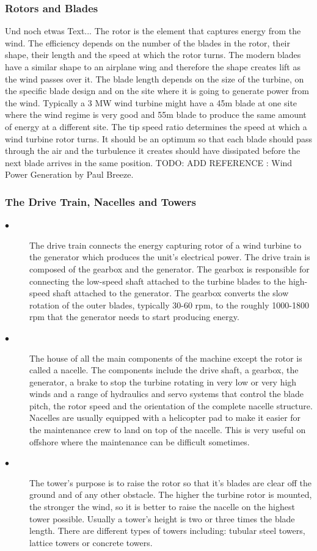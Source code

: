 \documentclass[twosided,a4,10pt]{article}
\begin{document}
\begin{multicols}{2}
 \subsubsection{Rotors and Blades}
 Und noch etwas Text... \cite{muster} \newline
 The rotor is the element that captures energy from the wind. The efficiency depends on the number of the blades in the rotor, their shape, their length and the speed at which the rotor turns. The modern blades have a similar shape to an airplane wing and therefore the shape creates lift as the wind passes over it. The blade length depends on the size of the turbine, on the specific blade design and on the site where it is going to generate power from the wind. Typically a 3 MW wind turbine might have a 45m blade at one site where the wind regime is very good and 55m blade to produce the same amount of energy at a different site. The tip speed ratio determines the speed at which a wind turbine rotor turns. It should be an optimum so that each blade should pass through the air and the turbulence it creates should have dissipated before the next blade arrives in the same position.
 TODO: ADD REFERENCE : Wind Power Generation by Paul Breeze.
\subsubsection{The Drive Train, Nacelles and Towers}
\begin{description}
\item[$\bullet$] 
The drive train connects the energy capturing rotor of a wind turbine to the generator which produces the unit's electrical power. The drive train is composed of the gearbox and the generator. The gearbox is responsible for connecting the low-speed shaft attached to the turbine blades to the high-speed shaft attached to the generator. The gearbox converts the slow rotation of the outer blades, typically 30-60 rpm, to the roughly 1000-1800 rpm that the generator needs to start producing energy.
\item[$\bullet$] 
The house of all the main components of the machine except the rotor is called a nacelle. The components include the drive shaft, a gearbox, the generator, a brake to stop the turbine rotating in very low or very high winds and a range of hydraulics and servo systems that control the blade pitch, the rotor speed and the orientation of the complete nacelle structure. Nacelles are usually equipped with a helicopter pad to make it easier for the maintenance crew to land on top of the nacelle. This is very useful on offshore where the maintenance can be difficult sometimes. 
\item[$\bullet$] 
The tower's purpose is to raise the rotor so that it's blades are clear off the ground and of any other obstacle. The higher the turbine rotor is mounted, the stronger the wind, so it is better to raise the nacelle on the highest tower possible. Usually a tower's height is two or three times the blade length. There are different types of towers including: tubular steel towers, lattice towers or concrete towers.


\end{description}
\end{multicols}
\end{document}
